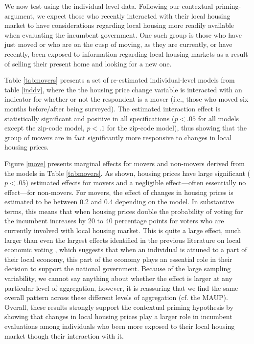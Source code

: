 \documentclass[12pt,a4paper]{article}
\begin{document}
	We now test \htwo using the individual level data. Following our contextual priming-argument, we expect those who recently interacted with their local housing market to have considerations regarding local housing more readily available when evaluating the incumbent government. One such group is those who have just moved or who are on the cusp of moving, as they are currently, or have recently, been exposed to information regarding local housing markets as a result of selling their present home and looking for a new one. 
	
	Table \ref{tabmovers} presents a set of re-estimated individual-level models from table \ref{inddv}, where the the housing price change variable is interacted with an indicator for whether or not the respondent is a mover (i.e., those who moved six months before/after being surveyed). The estimated interaction effect is statistically significant and positive in all specifications ($p<.05$ for all models except the zip-code model, $p<.1$ for the zip-code model), thus  showing that the group of movers are in fact significantly more responsive to changes in local housing prices. 
	
	Figure \ref{move} presents marginal effects for movers and non-movers derived from the models in Table \ref{tabmovers}. As shown, housing prices have large significant ($p<.05$) estimated effects for movers and a negligible effect—often essentially no effect—for non-movers. For movers, the effect of changes in housing prices is estimated to be between 0.2 and 0.4 depending on the model. In substantive terms, this means that when housing prices double the probability of voting for the incumbent increases by 20 to 40 percentage points for voters who are currently involved with local housing market. This is quite a large effect, much larger than even the largest effects identified in the previous literature on local economic voting \citep{healy2017presidential}, which suggests that when an individual is attuned to a part of their local economy, this part of the economy plays an essential role in their decision to support the national government. Because of the large sampling variability, we cannot say anything about whether the effect is larger at any particular level of aggregation, however, it is reassuring that we find the same overall pattern across these different levels of aggregation (cf. the MAUP). 
	Overall, these results strongly support the contextual priming hypothesis by showing that changes in local housing prices play a larger role in incumbent evaluations among individuals who been more exposed to their local housing market though their interaction with it.
	
\end{document}
